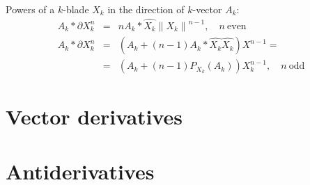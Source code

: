 \documentclass[a4paper,12pt]{article}
\providecommand{\norm}[1]{\left\lVert#1\right\rVert}
\providecommand{\normed}[1]{\hat{#1}}
\begin{document}
Powers of a $k$-blade $X_k$ in the direction of $k$-vector $A_k$:
\begin{eqnarray}
A_k * \partial X_k^n &=& n A_k * \normed{X_k} \norm{X_k}^{n-1},\quad n\ \mathrm{even}\\
A_k * \partial X_k^n &=& \left(A_k + (n-1) A_k*\normed{X_k}\normed{X_k}\right) X^{n-1}
=\nonumber\\
&=& \left(A_k + (n-1) P_{X_k}(A_k)\right) X_k^{n-1},\quad n\ \mathrm{odd}
\end{eqnarray}

\section{Vector derivatives}

\section{Antiderivatives}


\printbibliography[heading=bibintoc, title={References}]
\end{document}
